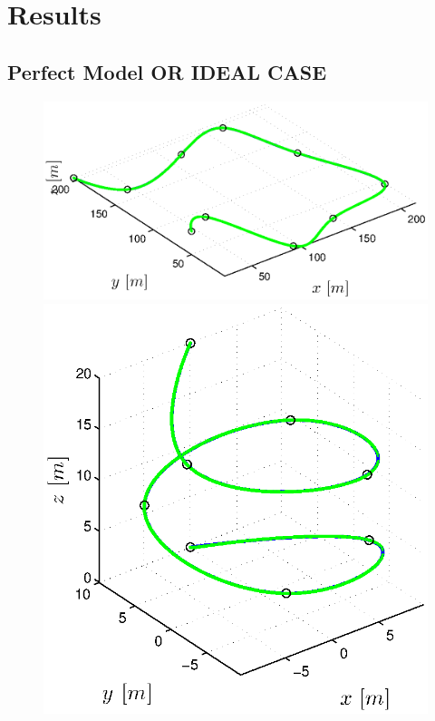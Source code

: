\section{Results}
\label{sec:results}

\subsection{Perfect Model OR IDEAL CASE}
\label{sub:results_perfect_model}

\begin{figure}[h]
  \begin{minipage}[t]{0.32\textwidth}
    \includegraphics[width = \textwidth]{trackings/figure_3D_road_SplineDegree3_trajectoryFollowing_Disturbance_0}
  \end{minipage}
  \hfill
  \begin{minipage}[t]{0.32\textwidth}
    \includegraphics[width = \textwidth]{trackings/figure_3D_helix_SplineDegree3_trajectoryFollowing_Disturbance_0}

\end{minipage}
\end{figure}
